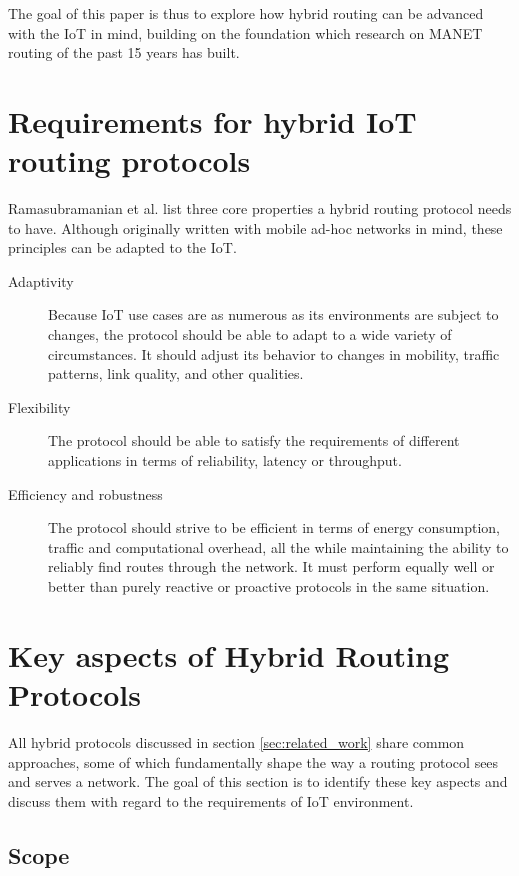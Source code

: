 \documentclass[a4paper,10pt]{scrartcl}
\begin{document}
The goal of this paper is thus to explore how hybrid routing can be advanced with the \gls{IoT} in mind, building on the foundation which research on \gls{MANET} routing of the past 15 years has built.\\ 

\section{Requirements for hybrid IoT routing protocols}
\label{subsec:requirements}
Ramasubramanian et al. \cite{SHARP} list three core properties a hybrid routing protocol needs to have. Although originally written with mobile ad-hoc networks in mind, these principles can be adapted to the IoT.
\begin{description}
\item[Adaptivity] Because IoT use cases are as numerous as its environments are subject to changes, the protocol should be able to adapt to a wide variety of circumstances. It should adjust its behavior to changes in mobility, traffic patterns, link quality, and other qualities.
\item[Flexibility] The protocol should be able to satisfy the requirements of different applications in terms of reliability, latency or throughput.
\item[Efficiency and robustness] The protocol should strive to be efficient in terms of energy consumption, traffic and computational overhead, all the while maintaining the ability to reliably find routes through the network. It must perform equally well or better than purely reactive or proactive protocols in the same situation.
\end{description}


\section{Key aspects of Hybrid Routing Protocols}
\label{sec:key_aspects}
All hybrid protocols discussed in section \ref{sec:related_work} share common approaches, some of which fundamentally shape the way a routing protocol sees and serves a network. The goal of this section is to identify these key aspects and discuss them with regard to the requirements of IoT environment.

\subsection{Scope}
\label{subsec:scope}
\end{document}
